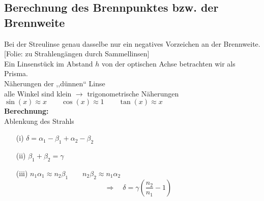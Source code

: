 \documentclass[titlepage,11pt,a4paper,ngerman]{report}
\newcommand{\folie}[1]{\color{gray}[Folie: #1]\color{black}}
\newcommand{\lcom}[1]{\color{MidnightBlue}#1\color{black}}
\begin{document}
\subsection{Berechnung des Brennpunktes bzw. der Brennweite}
\lcom{Bei der Streulinse genau dasselbe nur ein negatives Vorzeichen an der Brennweite.}\\
\folie{zu Strahlengängen durch Sammellinsen}\\[5pt]
Ein Linsenstück im Abstand $ h $ von der optischen Achse betrachten wir als Prisma.\\[5pt]
Näherungen der ,,dünnen`` Linse\\[5pt]
alle Winkel sind klein $ \rightarrow $ trigonometrische Näherungen\\
$ \sin(x) \approx x \qquad \cos(x) \approx 1 \qquad \tan(x) \approx x $\\[5pt]
\textbf{Berechnung:}\\
Ablenkung des Strahls\\
\begin{minipage}{.5\linewidth}
	\begin{enumerate}
		\item[(i)] $ \delta = \alpha_1 - \beta_1 + \alpha_2 - \beta_2 $
		\item[(ii)] $ \beta_1 + \beta_2 = \gamma $
		\item[(iii)] $ n_1 \alpha_1 \approx n_2 \beta_1 \qquad n_2 \beta_2 \approx n_1 \alpha_2 $
		\begin{equation*}
		\Rightarrow \quad \delta = \gamma\left(\frac{n_2}{n_1} - 1\right)
		\end{equation*}
	\end{enumerate}
\end{minipage}
\end{document}
